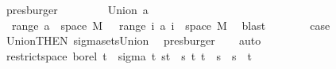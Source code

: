 \begin{isabellebody}
\ presburger\isanewline
\ \ \isamarkupfalse%
\isanewline
\ \ \ \ \isamarkupfalse%
\ {\isacharparenleft}{\kern0pt}Union\ a{\isacharparenright}{\kern0pt}\isanewline
\ \ \ \ \isamarkupfalse%
\ {\isachardoublequoteopen}{\isasymUnion}\ {\isacharparenleft}{\kern0pt}range\ a{\isacharparenright}{\kern0pt}\ {\isasymtimes}\ space\ M\ {\isacharequal}{\kern0pt}\ {\isasymUnion}\ {\isacharparenleft}{\kern0pt}range\ {\isacharparenleft}{\kern0pt}{\isasymlambda}i{\isachardot}{\kern0pt}\ a\ i\ {\isasymtimes}\ space\ M{\isacharparenright}{\kern0pt}{\isacharparenright}{\kern0pt}{\isachardoublequoteclose}\ \isamarkupfalse%
\ blast\isanewline
\ \ \ \ \isamarkupfalse%
\ \isamarkupfalse%
\ {\isacharquery}{\kern0pt}case\ \isamarkupfalse%
\ Union{\isacharparenleft}{\kern0pt}{}{\isacharparenright}{\kern0pt}{\isacharbrackleft}{\kern0pt}THEN\ sigma{\isacharunderscore}{\kern0pt}sets{\isachardot}{\kern0pt}Union{\isacharbrackright}{\kern0pt}\ \isamarkupfalse%
\ presburger\isanewline
\ \ \isamarkupfalse%
\ {\isacharparenleft}{\kern0pt}auto{\isacharparenright}{\kern0pt}\isanewline
\ \ \isamarkupfalse%
\ \isamarkupfalse%
\ {\isachardoublequoteopen}restrict{\isacharunderscore}{\kern0pt}space\ borel\ {\isacharbraceleft}{\kern0pt}t\ {\isacharequal}{\kern0pt}\ sigma\ {\isacharbraceleft}{\kern0pt}t\ {\isacharbraceleft}{\kern0pt}{\isacharbraceleft}{\kern0pt}s{\isacharless}{\kern0pt}{\isachardot}{\kern0pt}{\isachardot}{\kern0pt}t{\isacharbraceright}{\kern0pt}\ {\isacharbar}{\kern0pt}\ s\ t{\isachardot}{\kern0pt}\ t\ {\isasymle}\ s\ {\isasymand}\ s\ {\isacharless}{\kern0pt}\ t{\isacharbraceright}{\kern0pt}{\isachardoublequoteclose}\isanewline
\ \ \isamarkupfalse%
\ {\isacharminus}{\kern0pt}\isanewline
\ \ \ \ \isamarkupfalse%

\end{isabellebody}
